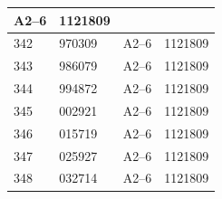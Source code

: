 \documentclass[UTF8,10pt,a4paper,fontset=fandol]{ctexart}
\newcommand{\fieldvalue}[1]{#1}
\begin{document}
\begin{center}
\begin{tabular}{|l|l|l|l|}
\fieldvalue{A2--6}&
\fieldvalue{1121809}\\
\hline
\fieldvalue{342}&
\fieldvalue{970309}&
\fieldvalue{A2--6}&
\fieldvalue{1121809}\\
\hline
\fieldvalue{343}&
\fieldvalue{986079}&
\fieldvalue{A2--6}&
\fieldvalue{1121809}\\
\hline
\fieldvalue{344}&
\fieldvalue{994872}&
\fieldvalue{A2--6}&
\fieldvalue{1121809}\\
\hline
\fieldvalue{345}&
\fieldvalue{002921}&
\fieldvalue{A2--6}&
\fieldvalue{1121809}\\
\hline
\fieldvalue{346}&
\fieldvalue{015719}&
\fieldvalue{A2--6}&
\fieldvalue{1121809}\\
\hline
\fieldvalue{347}&
\fieldvalue{025927}&
\fieldvalue{A2--6}&
\fieldvalue{1121809}\\
\hline
\fieldvalue{348}&
\fieldvalue{032714}&
\fieldvalue{A2--6}&
\fieldvalue{1121809}\\

\end{tabular}
\end{center}
\end{document}
